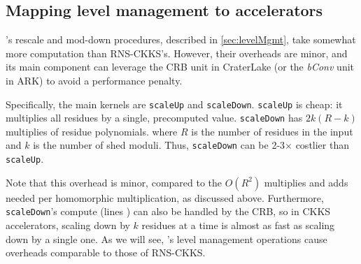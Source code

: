 



\subsection{Mapping \name level management to accelerators}
\label{sec:mapping}

\name's rescale and mod-down procedures, described in \autoref{sec:levelMgmt},
take somewhat more computation than RNS-CKKS's.
However, their overheads are minor, and its main component can leverage the CRB
unit in CraterLake (or the \textit{bConv} unit in ARK) to avoid a performance
penalty.

Specifically, the main kernels are \verb!scaleUp! and \verb!scaleDown!.
\verb!scaleUp! is cheap: it multiplies all residues by a single, precomputed
value.
\verb!scaleDown! has $2k(R-k)$ multiplies of residue polynomials.
where $R$ is the number of residues in the input and $k$ is the number of shed
moduli.
Thus,  \verb!scaleDown! can be 2-3$\times$ costlier than \verb!scaleUp!.

Note that this overhead is minor, compared to the $O(R^2)$ multiplies and adds
needed per homomorphic multiplication, as discussed above.
Furthermore, \verb!scaleDown!'s compute (lines ) can also be handled
by the CRB, so in CKKS accelerators, scaling down by $k$ residues at a time is
almost as fast as scaling down by a single one.
%
As we will see, \name's level management operations cause overheads comparable
to those of RNS-CKKS.

